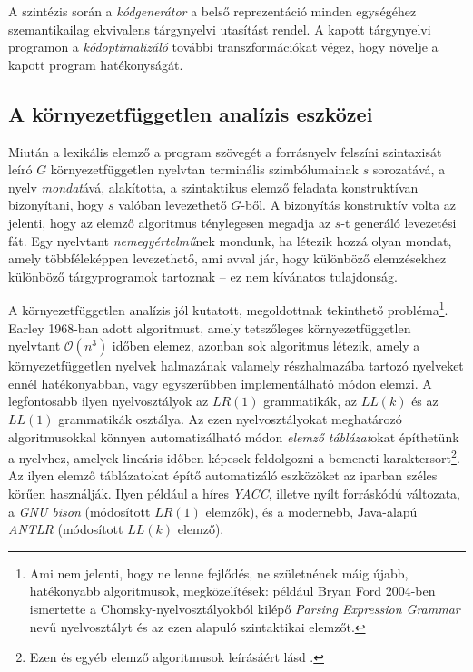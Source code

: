 A szintézis során a \textit{kódgenerátor} a belső reprezentáció minden egységéhez szemantikailag ekvivalens tárgynyelvi utasítást rendel.
A kapott tárgynyelvi programon a \textit{kódoptimalizáló} további transzformációkat végez, hogy növelje a kapott program hatékonyságát.


\subsection{A környezetfüggetlen analízis eszközei}
Miután a lexikális elemző a program szövegét a forrásnyelv felszíni szintaxisát leíró $G$ környezetfüggetlen nyelvtan terminális szimbólumainak $s$ sorozatává, a nyelv \textit{mondat}ává, alakította, a szintaktikus elemző feladata konstruktívan bizonyítani, hogy $s$ valóban levezethető $G$-ből.
A bizonyítás konstruktív volta az jelenti, hogy az elemző algoritmus ténylegesen megadja az $s$-t generáló levezetési fát.
Egy nyelvtant \textit{nemegyértelmű}nek mondunk, ha létezik hozzá olyan mondat, amely többféleképpen levezethető, ami avval jár, hogy különböző elemzésekhez különböző tárgyprogramok tartoznak -- ez nem kívánatos tulajdonság.

A környezetfüggetlen analízis jól kutatott, megoldottnak tekinthető probléma\footnote{
	Ami nem jelenti, hogy ne lenne fejlődés, ne születnének máig újabb, hatékonyabb algoritmusok, megközelítések: például Bryan Ford 2004-ben ismertette a Chomsky-nyelvosztályokból kilépő \textit{Parsing Expression Grammar} nevű nyelvosztályt és az ezen alapuló szintaktikai elemzőt\cite{Ford04PEG}.
}.
Earley 1968-ban adott algoritmust, amely tetszőleges környezetfüggetlen nyelvtant $\mathcal{O}(n^3)$ időben elemez, azonban sok algoritmus létezik, amely a környezetfüggetlen nyelvek halmazának valamely részhalmazába tartozó nyelveket ennél hatékonyabban, vagy egyszerűbben implementálható módon elemzi.
A legfontosabb ilyen nyelvosztályok az $LR(1)$ grammatikák, az $LL(k)$ és az $LL(1)$ grammatikák osztálya.
Az ezen nyelvosztályokat meghatározó algoritmusokkal könnyen automatizálható módon \textit{elemző táblázat}okat építhetünk a nyelvhez, amelyek lineáris időben képesek feldolgozni a bemeneti karaktersort\footnote{%
	Ezen és egyéb elemző algoritmusok leírásáért lásd \cite[4-6.~fejezetek]{Csornyei}.
}.
Az ilyen elemző táblázatokat építő automatizáló eszközöket az iparban széles körűen használják.
Ilyen például a híres \textit{YACC}, illetve nyílt forráskódú változata, a \textit{GNU bison} (módosított $LR(1)$ elemzők), és a modernebb, Java-alapú \textit{ANTLR} (módosított $LL(k)$ elemző).

